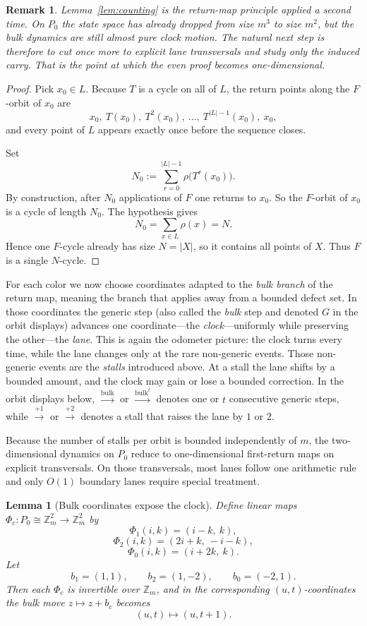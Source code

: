 \documentclass[11pt]{article}
\newtheorem{lemma}{Lemma}
\newtheorem{remark}{Remark}
\newcommand{\Zm}{\mathbb Z_m}
\newcommand{\bulk}{\mathrm{bulk}}   %
\begin{document}
\begin{remark}
Lemma~\ref{lem:counting} is the return-map principle applied a second time.
On $P_0$ the state space has already dropped from size $m^3$ to size $m^2$, but the bulk dynamics are still almost pure clock motion.
The natural next step is therefore to cut once more to explicit lane transversals and study only the induced carry.
That is the point at which the even proof becomes one-dimensional.
\end{remark}

\begin{proof}
Pick $x_0\in L$.
Because $T$ is a cycle on all of $L$, the return points along the $F$-orbit of $x_0$ are
\[
x_0,\ T(x_0),\ T^2(x_0),\ \dots,\ T^{|L|-1}(x_0),\ x_0,
\]
and every point of $L$ appears exactly once before the sequence closes.

Set
\[
N_0:=\sum_{r=0}^{|L|-1}\rho\bigl(T^r(x_0)\bigr).
\]
By construction, after $N_0$ applications of $F$ one returns to $x_0$.
So the $F$-orbit of $x_0$ is a cycle of length $N_0$.
The hypothesis gives
\[
N_0=\sum_{x\in L}\rho(x)=N.
\]
Hence one $F$-cycle already has size $N=|X|$, so it contains all points of $X$.
Thus $F$ is a single $N$-cycle.
\end{proof}

For each color we now choose coordinates adapted to the \emph{bulk branch} of the return map, meaning the branch that applies away from a bounded defect set.
In those coordinates the generic step (also called the \emph{bulk} step and denoted $G$ in the orbit displays) advances one coordinate---the \emph{clock}---uniformly while preserving the other---the \emph{lane}.
This is again the odometer picture: the clock turns every time, while the lane changes only at the rare non-generic events.
Those non-generic events are the \emph{stalls} introduced above.
At a stall the lane shifts by a bounded amount, and the clock may gain or lose a bounded correction.
In the orbit displays below, $\xrightarrow{\bulk}$ or $\xrightarrow{\bulk^t}$ denotes one or $t$ consecutive generic steps, while $\xrightarrow{+1}$ or $\xrightarrow{+2}$ denotes a stall that raises the lane by $1$ or $2$.

Because the number of stalls per orbit is bounded independently of $m$, the two-dimensional dynamics on $P_0$ reduce to one-dimensional first-return maps on explicit transversals.
On those transversals, most lanes follow one arithmetic rule and only $O(1)$ boundary lanes require special treatment.

\begin{lemma}[Bulk coordinates expose the clock]\label{lem:routeE-bulkcoords}
Define linear maps $\Phi_c:P_0\cong \Zm^2\to \Zm^2$ by
\[
\Phi_1(i,k)=(i-k,\ k),
\]
\[
\Phi_2(i,k)=(2i+k,\ -i-k),
\]
\[
\Phi_0(i,k)=(i+2k,\ k).
\]
Let
\[
b_1=(1,1),\qquad b_2=(1,-2),\qquad b_0=(-2,1).
\]
Then each $\Phi_c$ is invertible over $\Zm$, and in the corresponding $(u,t)$-coordinates the bulk move $z\mapsto z+b_c$ becomes
\[
(u,t)\mapsto (u,t+1).
\]
\end{lemma}
\end{document}
